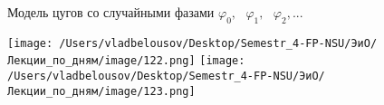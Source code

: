 \documentclass[12pt, a4paper]{report}
\begin{document}
Модель цугов со случайными фазами \( \varphi_0 ,\text{ }  \varphi_1 , \text{ }  \varphi_2 ,... \) 

\begin{center}
    \texttt{[image: /Users/vladbelousov/Desktop/Semestr\_4-FP-NSU/ЭиО/Лекции\_по\_дням/image/122.png]}
    \texttt{[image: /Users/vladbelousov/Desktop/Semestr\_4-FP-NSU/ЭиО/Лекции\_по\_дням/image/123.png]}
\end{center}  



\ifdefined\mainfile
\else
    
\end{document}
